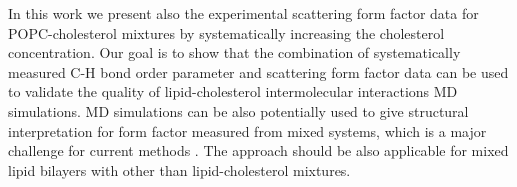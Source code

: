 \documentclass[aps,prl,superscriptaddress,twocolumn]{revtex4}
\begin{document}
In this work we present also the experimental scattering form factor
data for POPC-cholesterol mixtures by systematically increasing the
cholesterol concentration. Our goal is to show that the combination
of systematically measured C-H bond order parameter and scattering form
factor data can be used to validate the quality of lipid-cholesterol
intermolecular interactions MD simulations. MD simulations can be also
potentially used to give structural interpretation for form factor
measured from mixed systems, which is a major challenge for current methods \cite{pan12,Heftberger15,Marquardt15,??}. 
The approach should be also applicable for mixed lipid bilayers with
other than lipid-cholesterol mixtures.






\end{document}
